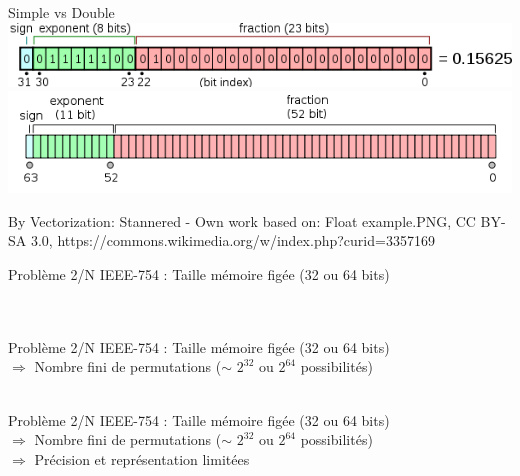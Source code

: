 \documentclass{beamer}
\begin{document}
  \begin{frame}{Simple vs Double} 
    \includegraphics[width=\textwidth]{float_representation}
    \includegraphics[width=\textwidth]{double_representation}
          \vfill{}
          \begin{tiny}
    By Vectorization: Stannered - Own work based on: Float example.PNG, CC BY-SA 3.0, https://commons.wikimedia.org/w/index.php?curid=3357169
          \end{tiny}
  \end{frame}
  
    \begin{frame}{Problème 2/N}
    IEEE-754 : Taille mémoire figée (32 ou 64 bits) \\
    \textcolor{white}{ } \\
    \textcolor{white}{ } \\
   \end{frame}
  
  \begin{frame}{Problème 2/N}
    IEEE-754 : Taille mémoire figée (32 ou 64 bits) \\
    $\Rightarrow$ Nombre fini de permutations ($\sim$ $2^{32}$ ou $2^{64}$ possibilités)\\
    \textcolor{white}{ } \\
  \end{frame}
  
  \begin{frame}{Problème 2/N}
    IEEE-754 : Taille mémoire figée (32 ou 64 bits) \\
    $\Rightarrow$ Nombre fini de permutations ($\sim$ $2^{32}$ ou $2^{64}$ possibilités)\\
    $\Rightarrow$ Précision et représentation limitées \\
  \end{frame}
  
\end{document}
